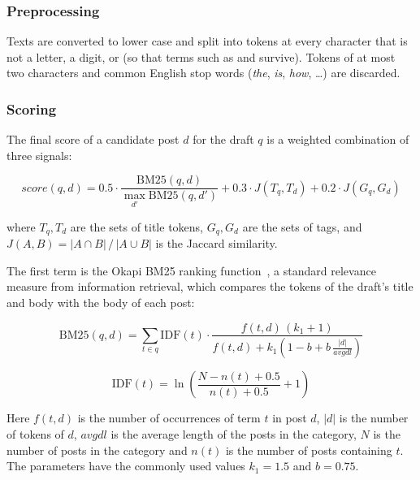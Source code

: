 \subsubsection*{Preprocessing}

Texts are converted to lower case and split into tokens at every character that is not
a letter, a digit, \code{\#} or \code{+} (so that terms such as  and
 survive). Tokens of at most two characters and common English stop words
(\emph{the}, \emph{is}, \emph{how}, \dots) are discarded.

\subsubsection*{Scoring}

The final score of a candidate post $d$ for the draft $q$ is a weighted combination of
three signals:

\begin{equation}
  \mathit{score}(q,d) = 0.5 \cdot \frac{\mathrm{BM25}(q,d)}{\max_{d'} \mathrm{BM25}(q,d')}
    + 0.3 \cdot J(T_q, T_d) + 0.2 \cdot J(G_q, G_d)
  \label{eq:score}
\end{equation}

\noindent where $T_q, T_d$ are the sets of title tokens, $G_q, G_d$ are the sets of tags,
and $J(A,B) = |A \cap B| \,/\, |A \cup B|$ is the Jaccard similarity.

The first term is the Okapi BM25 ranking function~\cite{bm25}, a standard relevance measure
from information retrieval, which compares the tokens of the draft's title and body with
the body of each post:

\begin{equation}
  \mathrm{BM25}(q,d) = \sum_{t \in q} \mathrm{IDF}(t) \cdot
    \frac{f(t,d)\,(k_1 + 1)}{f(t,d) + k_1 \left(1 - b + b\,\frac{|d|}{\mathit{avgdl}}\right)}
\end{equation}

\begin{equation}
  \mathrm{IDF}(t) = \ln\!\left(\frac{N - n(t) + 0.5}{n(t) + 0.5} + 1\right)
\end{equation}

\noindent Here $f(t,d)$ is the number of occurrences of term $t$ in post $d$, $|d|$ is
the number of tokens of $d$, $\mathit{avgdl}$ is the average length of the posts in the
category, $N$ is the number of posts in the category and $n(t)$ is the number of posts
containing $t$. The parameters have the commonly used values $k_1 = 1.5$ and $b = 0.75$.

